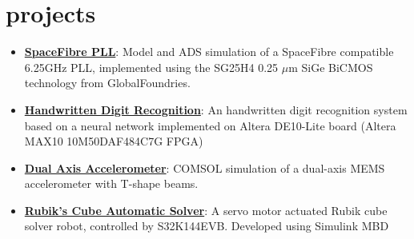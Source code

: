 \documentclass[10pt]{article}
\begin{document}
\section{projects}
\begin{itemize}[noitemsep,leftmargin=3.5mm,rightmargin=0mm,topsep=6pt]
    \item \textbf{\href{https://github.com/leonardobove/spacefiber_pll}{SpaceFibre PLL}}: Model and ADS simulation of a SpaceFibre compatible 6.25GHz PLL, implemented using the SG25H4 0.25 \(\mu\)m SiGe BiCMOS technology from GlobalFoundries.
    \item \textbf{\href{https://github.com/leonardobove/handwritten_digit_recognition}{Handwritten Digit Recognition}}: An handwritten digit recognition system based on a neural network implemented on Altera DE10-Lite board (Altera MAX10 10M50DAF484C7G FPGA)
    \item \textbf{\href{https://github.com/leonardobove/dual_axis_accelerometer}{Dual Axis Accelerometer}}: COMSOL simulation of a dual-axis MEMS accelerometer with T-shape beams.
    \item \textbf{\href{https://github.com/leonardobove/rubiks_cube_automatic_solver/tree/main}{Rubik's Cube Automatic Solver}}: A servo motor actuated Rubik cube solver robot, controlled by S32K144EVB. Developed using Simulink MBD
\end{itemize}

\vspace*{\fill}
\end{document}
